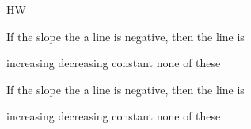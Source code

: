 \documentclass{article}
\begin{document}
\begin{exam}{HW}
\begin{problem}[3]
If the slope the a line is negative, then the line is
    \begin{answers}{4}
    \bChoices
         increasing\eAns
         decreasing\eAns
         constant\eAns
         none of these\eAns
    \eChoices
    \end{answers}

%
\ifkeyalt
\begin{solution}[.25in]
If the slope the a line is negative, then the line is
    \begin{answers}{4}
    \bChoices
         increasing\eAns
         decreasing\eAns
         constant\eAns
         none of these\eAns
    \eChoices
    \end{answers}
\end{solution}
\fi
\end{problem}
\end{exam}
\end{document}
